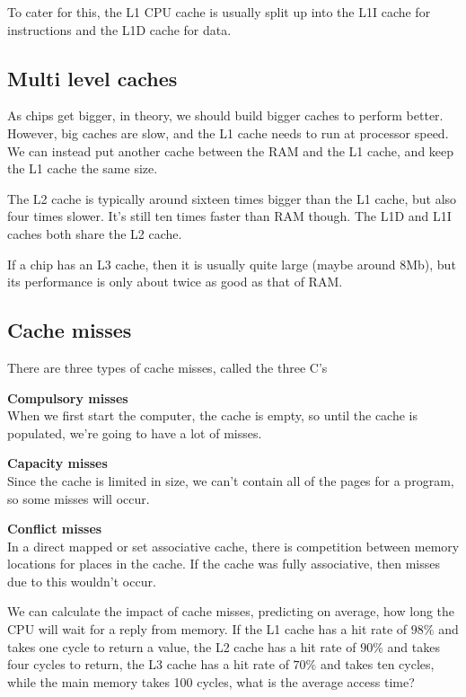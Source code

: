 To cater for this, the L1 CPU cache is usually split up into the L1I cache for 
instructions and the L1D cache for data.

\subsection{Multi level caches}

As chips get bigger, in theory, we should build bigger caches to perform better.
However, big caches are slow, and the L1 cache needs to run at processor speed.
We can instead put another cache between the RAM and the L1 cache, and keep the
L1 cache the same size.

The L2 cache is typically around sixteen times bigger than the L1 cache, but
also four times slower. It's still ten times faster than RAM though. The L1D and
L1I caches both share the L2 cache.

If a chip has an L3 cache, then it is usually quite large (maybe around 8Mb),
but its performance is only about twice as good as that of RAM.


\subsection{Cache misses}

There are three types of cache misses, called the three C's

\begin{description}
  \item \textbf{Compulsory misses}\\ 
    When we first start the computer, the cache is empty, so until the cache is
    populated, we're going to have a lot of misses.
  \item \textbf{Capacity misses}\\
   Since the cache is limited in size, we can't contain all of the pages for a
   program, so some misses will occur.
  \item \textbf{Conflict misses}\\
    In a direct mapped or set associative cache, there is competition between
    memory locations for places in the cache. If the cache was fully
    associative, then misses due to this wouldn't occur.
\end{description}

We can calculate the impact of cache misses, predicting on average, how long the
CPU will wait for a reply from memory. If the L1 cache has a hit rate of $98\%$
and takes one cycle to return a value, the L2 cache has a hit rate of $90\%$
and takes four cycles to return, the L3 cache has a hit rate of $70\%$ and takes
ten cycles, while the main memory takes 100 cycles, what is the average access 
time?


